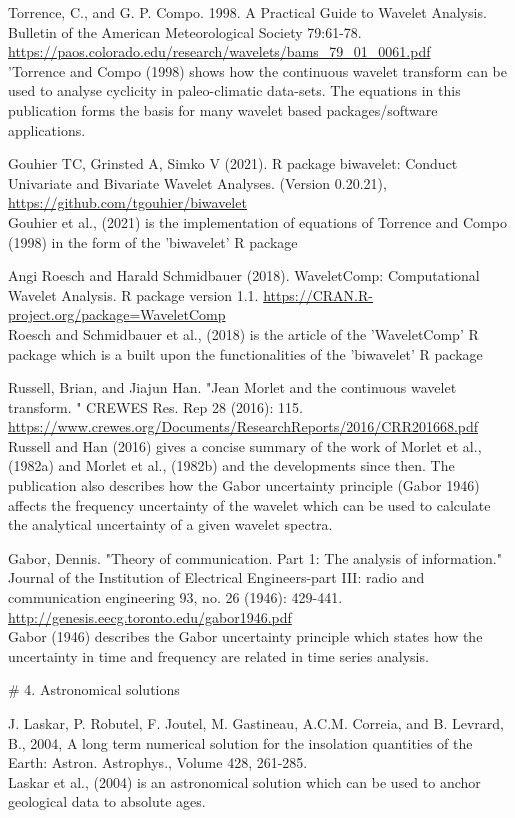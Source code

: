 \documentclass[a4paper]{book}
\begin{document}
\begin{References}
Torrence, C., and G. P. Compo. 1998. A Practical Guide to Wavelet Analysis.
Bulletin of the American Meteorological Society 79:61-78.
\url{https://paos.colorado.edu/research/wavelets/bams_79_01_0061.pdf} \\{}
'Torrence and Compo (1998) shows how the continuous wavelet transform can be used to analyse
cyclicity in paleo-climatic data-sets. The equations in this publication forms the basis for many
wavelet based packages/software applications.

Gouhier TC, Grinsted A, Simko V (2021).
R package biwavelet: Conduct Univariate and Bivariate Wavelet Analyses. (Version 0.20.21),
\url{https://github.com/tgouhier/biwavelet}\\{}
Gouhier et al., (2021) is the implementation of equations of Torrence and Compo (1998) in the form of the
'biwavelet' R package

Angi Roesch and Harald Schmidbauer (2018). WaveletComp: Computational
Wavelet Analysis. R package version 1.1.
\url{https://CRAN.R-project.org/package=WaveletComp}\\{}
Roesch and Schmidbauer et al., (2018) is the article of the 'WaveletComp' R package which
is a built upon the functionalities of the 'biwavelet' R package

Russell, Brian, and Jiajun Han. "Jean Morlet and the continuous wavelet transform.
" CREWES Res. Rep 28 (2016): 115. \url{https://www.crewes.org/Documents/ResearchReports/2016/CRR201668.pdf}\\{}
Russell and Han (2016) gives a concise summary of the work of Morlet et al., (1982a) and Morlet et al., (1982b) and the
developments since then. The publication also describes how the Gabor uncertainty principle (Gabor 1946) affects the frequency
uncertainty of the wavelet which can be used to calculate the analytical uncertainty of a given wavelet spectra.

Gabor, Dennis. "Theory of communication. Part 1: The analysis of information."
Journal of the Institution of Electrical Engineers-part III: radio and
communication engineering 93, no. 26 (1946): 429-441. \url{http://genesis.eecg.toronto.edu/gabor1946.pdf}\\{}
Gabor (1946) describes the Gabor uncertainty principle which states how the uncertainty in time and frequency are related
in time series analysis.

\# 4. Astronomical solutions

J. Laskar, P. Robutel, F. Joutel, M. Gastineau, A.C.M. Correia, and B. Levrard, B., 2004,
A long term numerical solution for the insolation quantities of the Earth: Astron. Astrophys.,
Volume 428, 261-285. \\{}
Laskar et al., (2004) is an astronomical solution which can be used to anchor geological data to absolute ages.


\end{References}
\end{document}

